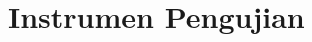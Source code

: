 \documentclass[../index.tex]{subfiles}
\begin{document}
\chapter{Instrumen Pengujian}
\end{document}
